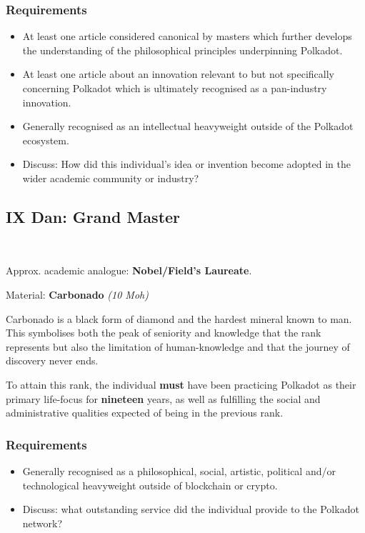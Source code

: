 \documentclass[9pt,oneside]{amsart}
\begin{document}
\subsubsection{Requirements}\label{requirements-7}

\begin{itemize}
\item At least one article considered canonical by masters which further develops the understanding of the philosophical principles underpinning Polkadot.
\item At least one article about an innovation relevant to but not specifically concerning Polkadot which is ultimately recognised as a pan-industry innovation.
\item Generally recognised as an intellectual heavyweight outside of the Polkadot ecosystem.
\item Discuss: How did this individual's idea or invention become adopted in the wider academic community or industry?
\end{itemize}

\subsection{IX Dan: Grand Master}\label{ix-dan-grand-master}~\\


Approx. academic analogue: \textbf{Nobel/Field's Laureate}.

Material: \textbf{Carbonado} \emph{(10 Moh)}

Carbonado is a black form of diamond and the hardest mineral known to man. This symbolises both the peak of seniority and knowledge that the rank represents but also the limitation of human-knowledge and that the journey of discovery never ends.

To attain this rank, the individual \textbf{must} have been practicing Polkadot as their primary life-focus for \textbf{nineteen} years, as well as fulfilling the social and administrative qualities expected of being in the previous rank.

\subsubsection{Requirements}\label{requirements-8}

\begin{itemize}
\item Generally recognised as a philosophical, social, artistic, political and/or technological heavyweight outside of blockchain or crypto.
\item Discuss: what outstanding service did the individual provide to the Polkadot network?
\end{itemize}
\end{document}
